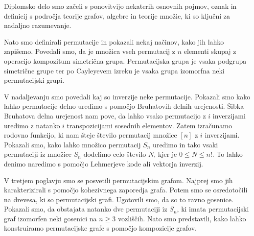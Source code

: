 \documentclass[a4paper, 12pt]{book}
\begin{document}
Diplomsko delo smo začeli s ponovitvijo nekaterih osnovnih pojmov, oznak in definicij s področja teorije grafov, algebre in teorije množic, ki so ključni za nadaljno razumevanje.

Nato smo definirali permutacije in pokazali nekaj načinov, kako jih lahko zapišemo. Povedali smo, da je množica vseh permutacij z $n$ elementi skupaj z operacijo kompozitum simetrična grupa. Permutacijska grupa je vsaka podgrupa simetrične grupe ter po Cayleyevem izreku je vsaka grupa izomorfna neki permutacijski grupi.

V nadaljevanju smo povedali kaj so inverzije neke permutacije. Pokazali smo kako lahko permutacije delno uredimo s pomočjo Bruhatovih delnih urejenosti. Šibka Bruhatova delna urejenost nam pove, da lahko vsako permutacijo z $i$ inverzijami uredimo z natanko $i$ transpozicijami sosednih elementov. Zatem izračunamo rodovno funkcijo, ki nam šteje število permutacij množice $[n]$ z $i$ inverzijami. Pokazali smo, kako lahko množico permutacij $S_n$ uredimo in tako vsaki permutaciji iz množice $S_n$ dodelimo celo število $N$, kjer je $0 \leq N \leq n!$. To lahko denimo naredimo s pomočjo Lehmerjeve kode ali vektorja inverzij.

V tretjem poglavju smo se posvetili permutacijskim grafom. Najprej smo jih karakterizirali s pomočjo kohezivnega zaporedja grafa. Potem smo se osredotočili na drevesa, ki so permutacijski grafi. Ugotovili smo, da so to ravno gosenice. Pokazali smo, da obstajata natanko dve permutaciji iz $S_n$, ki imata permutacijski graf izomorfen neki gosenici na $n \geq 3$ vozliščih. Nato smo predstavili, kako lahko konstruiramo permutacijske grafe s pomočjo kompozicije grafov.
\end{document}
